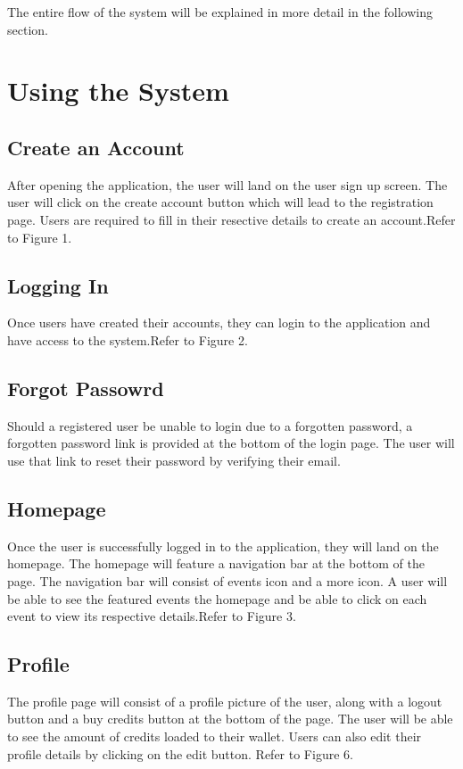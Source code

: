 \documentclass{article}
\begin{document}
The entire flow of the system will be explained in more detail in the following section.
 



 \section{Using the System}


 \subsection{Create an Account}
 After opening the application, the user will land on the user sign up screen.
 The user will click on the create account button which will lead to the registration page.
 Users are required to fill in their resective details to create an account.Refer to Figure 1.

 \subsection{Logging In}
 Once users have created their accounts, they can login to the application and have 
 access to the system.Refer to Figure 2.

 \subsection{Forgot Passowrd}
 Should a registered user be unable to login due to a forgotten password,
  a forgotten password link is provided at the bottom of the login page.
  The user will use that link to reset their password by verifying their email.

\subsection{Homepage}
Once the user is successfully logged in to the application, they will land on the homepage.
The homepage will feature a navigation bar at the bottom of the page. The navigation bar
will consist of events icon and a more icon. A user will be able to see the featured events 
the homepage and be able to click on each event to view its respective details.Refer to Figure 3.

 \subsection{Profile}
 The profile page will consist of a profile picture of the user, along with a logout button and
a buy credits button at the bottom of the page. 
The user will be able to see the amount of credits loaded to their wallet.
Users can also edit their profile details by clicking on the edit button. Refer to Figure 6.
\end{document}
